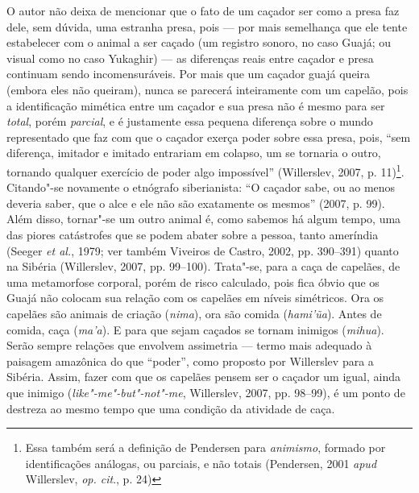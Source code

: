 O autor não deixa de mencionar que o fato de um caçador ser como a presa
faz dele, sem dúvida, uma estranha presa, pois --- por mais semelhança que
ele tente estabelecer com o animal a ser caçado (um registro sonoro, no
caso Guajá; ou visual como no caso Yukaghir) --- as diferenças reais entre
caçador e presa continuam sendo incomensuráveis. Por mais que um caçador
guajá queira (embora eles não queiram), nunca se parecerá inteiramente
com um capelão, pois a identificação mimética entre um caçador e sua
presa não é mesmo para ser \emph{total}, porém \emph{parcial}, e é
justamente essa pequena diferença sobre o mundo representado que faz com
que o caçador exerça poder sobre essa presa, pois, ``sem diferença,
imitador e imitado entrariam em colapso, um se tornaria o outro,
tornando qualquer exercício de poder algo impossível'' (Willerslev, 2007,
p. 11)\footnote{Essa também será a definição de Pendersen para
  \emph{animismo}, formado por identificações análogas, ou parciais, e
  não totais (Pendersen, 2001 \emph{apud} Willerslev, \emph{op. cit}., p. 24)}.
Citando"-se novamente o etnógrafo siberianista: ``O caçador sabe, ou ao
menos deveria saber, que o alce e ele não são exatamente os mesmos''
(2007, p. 99). Além disso, tornar"-se um outro animal é, como sabemos há
algum tempo, uma das piores catástrofes que se podem abater sobre a
pessoa, tanto ameríndia (Seeger \emph{et al.}, 1979; ver também Viveiros
de Castro, 2002, pp. 390--391) quanto na Sibéria (Willerslev, 2007,
pp. 99--100). Trata"-se, para a caça de capelães, de uma metamorfose
corporal, porém de risco calculado, pois fica óbvio que os Guajá não
colocam sua relação com os capelães em níveis simétricos. Ora os
capelães são animais de criação (\emph{nima}), ora são comida
(\emph{hami'ũa}). Antes de comida, caça (\emph{ma'a}). E para que sejam
caçados se tornam inimigos (\emph{mihua}). Serão sempre relações que
envolvem assimetria --- termo mais adequado à paisagem amazônica do que
``poder'', como proposto por Willerslev para a Sibéria. Assim, fazer com
que os capelães pensem ser o caçador um igual, ainda que inimigo
(\emph{like"-me"-but"-not"-me}, Willerslev, 2007, pp. 98--99), é um ponto de
destreza ao mesmo tempo que uma condição da atividade de caça.

